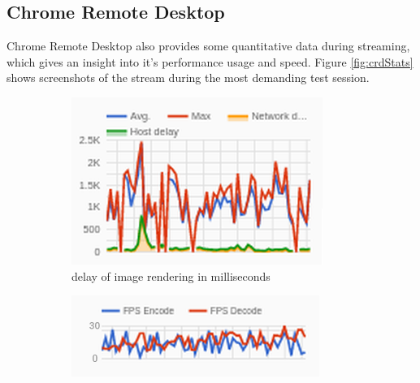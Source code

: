 \subsection{Chrome Remote Desktop}\label{subsec:QualityCRD}

Chrome Remote Desktop also provides some quantitative data during streaming, which gives an insight into it's performance usage and speed. Figure \ref{fig:crdStats} shows screenshots of the stream during the most demanding test session.

\begin{figure}[h]
  \begin{subfigure}{.33\textwidth}
    \centering
    \includegraphics[width=1\linewidth]{Figures/crd/delay}
    \captionsetup{width=.85\linewidth}
    \caption{delay of image rendering in milliseconds}
    \label{fig:crdDelay}
  \end{subfigure}%
  \begin{subfigure}{.33\textwidth}
    \centering
    \includegraphics[width=1\linewidth]{Figures/crd/fps}

\end{subfigure}
\end{figure}
